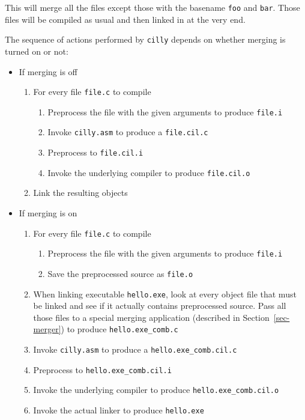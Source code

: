 \documentclass[letterpaper]{article}
\def\secref#1{Section~\ref{sec-#1}}
\def\t#1{{\tt #1}}
\begin{document}
 This will merge all the files except those with the basename \t{foo} and
\t{bar}. Those files will be compiled as usual and then linked in at the very
end. 

 The sequence of actions performed by \t{cilly} depends on whether merging
is turned on or not:
\begin{itemize}
\item If merging is off
  \begin{enumerate}
    \item For every file \t{file.c} to compile
         \begin{enumerate}
            \item Preprocess the file with the given arguments to 
                  produce \t{file.i}
            \item Invoke \t{cilly.asm} to produce a \t{file.cil.c}
            \item Preprocess to \t{file.cil.i}
            \item Invoke the underlying compiler to produce \t{file.cil.o}
         \end{enumerate}
    \item Link the resulting objects
  \end{enumerate}
\item If merging is on
  \begin{enumerate}
    \item For every file \t{file.c} to compile
         \begin{enumerate}
            \item Preprocess the file with the given arguments to 
                  produce \t{file.i}
            \item Save the preprocessed source as \t{file.o}
         \end{enumerate}
    \item When linking executable \t{hello.exe}, look at every object 
          file that must be linked and see if it actually 
          contains preprocessed source. Pass all those files to a 
          special merging application (described in
          \secref{merger}) to produce \t{hello.exe\_comb.c}
    \item Invoke \t{cilly.asm} to produce a \t{hello.exe\_comb.cil.c}
    \item Preprocess to \t{hello.exe\_comb.cil.i}
    \item Invoke the underlying compiler to produce \t{hello.exe\_comb.cil.o}
    \item Invoke the actual linker to produce \t{hello.exe}
  \end{enumerate}
\end{itemize}
\end{document}
